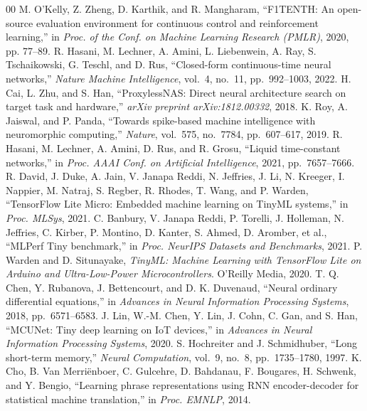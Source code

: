 \documentclass[conference]{IEEEtran}
\begin{document}
\begin{thebibliography}{00}
 M. O'Kelly, Z. Zheng, D. Karthik, and R. Mangharam, ``F1TENTH: An open-source evaluation environment for continuous control and reinforcement learning,'' in \textit{Proc. of the Conf. on Machine Learning Research (PMLR)}, 2020, pp. 77--89.
 R. Hasani, M. Lechner, A. Amini, L. Liebenwein, A. Ray, S. Tschaikowski, G. Teschl, and D. Rus, ``Closed-form continuous-time neural networks,'' \textit{Nature Machine Intelligence}, vol.~4, no.~11, pp.~992--1003, 2022.
 H. Cai, L. Zhu, and S. Han, ``ProxylessNAS: Direct neural architecture search on target task and hardware,'' \textit{arXiv preprint arXiv:1812.00332}, 2018.
 K. Roy, A. Jaiswal, and P. Panda, ``Towards spike-based machine intelligence with neuromorphic computing,'' \textit{Nature}, vol.~575, no.~7784, pp.~607--617, 2019.
 R. Hasani, M. Lechner, A. Amini, D. Rus, and R. Grosu, ``Liquid time-constant networks,'' in \textit{Proc. AAAI Conf. on Artificial Intelligence}, 2021, pp.~7657--7666.
 R. David, J. Duke, A. Jain, V. Janapa Reddi, N. Jeffries, J. Li, N. Kreeger, I. Nappier, M. Natraj, S. Regber, R. Rhodes, T. Wang, and P. Warden, ``TensorFlow Lite Micro: Embedded machine learning on TinyML systems,'' in \textit{Proc. MLSys}, 2021.
 C. Banbury, V. Janapa Reddi, P. Torelli, J. Holleman, N. Jeffries, C. Kirber, P. Montino, D. Kanter, S. Ahmed, D. Aromber, et al., ``MLPerf Tiny benchmark,'' in \textit{Proc. NeurIPS Datasets and Benchmarks}, 2021.
 P. Warden and D. Situnayake, \textit{TinyML: Machine Learning with TensorFlow Lite on Arduino and Ultra-Low-Power Microcontrollers}. O'Reilly Media, 2020.
 T. Q. Chen, Y. Rubanova, J. Bettencourt, and D. K. Duvenaud, ``Neural ordinary differential equations,'' in \textit{Advances in Neural Information Processing Systems}, 2018, pp.~6571--6583.
 J. Lin, W.-M. Chen, Y. Lin, J. Cohn, C. Gan, and S. Han, ``MCUNet: Tiny deep learning on IoT devices,'' in \textit{Advances in Neural Information Processing Systems}, 2020.
 S. Hochreiter and J. Schmidhuber, ``Long short-term memory,'' \textit{Neural Computation}, vol.~9, no.~8, pp.~1735--1780, 1997.
 K. Cho, B. Van Merriënboer, C. Gulcehre, D. Bahdanau, F. Bougares, H. Schwenk, and Y. Bengio, ``Learning phrase representations using RNN encoder-decoder for statistical machine translation,'' in \textit{Proc. EMNLP}, 2014.

\end{thebibliography}
\end{document}
